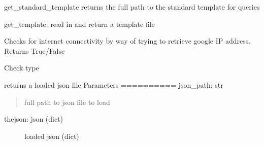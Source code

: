 \documentclass[letterpaper,10pt,english]{sphinxmanual}
\begin{document}

\begin{fulllineitems}
\label{nidm:nidm.utils.get_query_template}
get\_standard\_template
returns the full path to the standard template for queries

\end{fulllineitems}


\begin{fulllineitems}
\label{nidm:nidm.utils.get_template}
get\_template: read in and return a template file

\end{fulllineitems}


\begin{fulllineitems}
\label{nidm:nidm.utils.has_internet_connectivity}
Checks for internet connectivity by way of trying to
retrieve google IP address. Returns True/False

\end{fulllineitems}


\begin{fulllineitems}
\label{nidm:nidm.utils.is_type}
Check type

\end{fulllineitems}


\begin{fulllineitems}
\label{nidm:nidm.utils.load_json}
returns a loaded json file
Parameters
==========
json\_path: str
\begin{quote}

full path to json file to load
\end{quote}
\begin{description}
\item[{thejson: json (dict)}] \leavevmode
loaded json (dict)

\end{description}

\end{fulllineitems}
\end{document}
